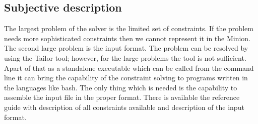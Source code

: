 \subsection{Subjective description}
The largest problem of the solver is the limited set of constraints. If the problem needs
more sophisticated constraints then we cannot represent it in the Minion.
The second large problem is the input format. The problem can be resolved 
by using the Tailor tool; however, for the large problems the tool is not sufficient.
Apart of that as a standalone executable which can be called from the command line it can bring the capability of 
the constraint solving to programs written in the languages like bash. The only
thing which is needed is the capability to assemble the input file in the proper format. 
There is available the reference guide \cite{minion:manual} with description of all constraints available and
description of the input format.